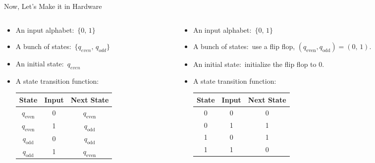 \documentclass[aspectratio=169, 11pt, handout]{beamer}
\begin{document}
\begin{frame}{Now, Let's Make it in Hardware}

\begin{columns}

\begin{column}{0.5\textwidth}
    \begin{itemize}
        \item An input alphabet:~$\{0,\,1\}$
        \item A bunch of states:~$\{q_{even},\,q_{odd} \}$
        \item An initial state:~$q_{even}$
        \item A state transition function:
        
\begin{center}
\begin{tabular}{cc|c}
\toprule
State & Input & Next State\\
\midrule
\(q_{\mathrm{even}}\) & 0 & \(q_{\mathrm{even}}\)\\
\(q_{\mathrm{even}}\) & 1 & \(q_{\mathrm{odd }}\)\\
\(q_{\mathrm{odd }}\) & 0 & \(q_{\mathrm{odd }}\)\\
\(q_{\mathrm{odd }}\) & 1 & \(q_{\mathrm{even}}\)\\
\bottomrule
\end{tabular}
\end{center}

    \end{itemize}
\end{column}\pause

\begin{column}{0.5\textwidth}
    \begin{itemize}
        \item An input alphabet:~$\{0,\,1\}$\pause
        \item A bunch of states\pause :~use a flip flop, $(q_{\mathrm{even}}, q_{\mathrm{odd}}) = (0,\, 1)$. \pause
        \item An initial state\pause :~initialize the flip flop to 0.\pause
        \item A state transition function\pause:
        \begin{center}
\begin{tabular}{cc|c}
\toprule
State & Input & Next State\\
\midrule
0 & 0 & 0\\
0 & 1 & 1\\
1 & 0 & 1\\
1 & 1 & 0\\
\bottomrule
\end{tabular}
\end{center}

        
    \end{itemize}
\end{column}
    \end{columns}
\end{frame}
\end{document}
